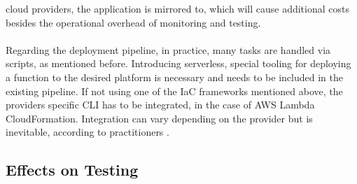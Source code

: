 \documentclass[a4paper,twoside,11pt, pagesize]{scrartcl}
\begin{document}
cloud providers, the application is mirrored to, which will cause additional costs besides the operational overhead of monitoring and testing.\\\\ Regarding the deployment pipeline, in practice, many tasks are handled via scripts, as mentioned before. Introducing serverless, special tooling for deploying a function to the desired platform is necessary and needs to be included in the existing pipeline. If not using one of the IaC frameworks mentioned above, the providers specific CLI has to be integrated, in the case of AWS Lambda CloudFormation. Integration can vary depending on the provider but is inevitable, according to practitioners \cite{ivanov2018implementation}.
\subsection{Effects on Testing}
\end{document}
